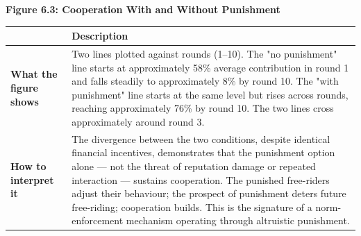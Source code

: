 \documentclass[12pt, letterpaper]{article}
\begin{document}
\newpage
\textbf{Figure 6.3: Cooperation With and Without Punishment}

\begin{figure}[htbp]
\centering

\begin{subfigure}{0.52\textwidth}
\centering
{}
\end{subfigure}

\hfill
\end{figure}


\begin{table}[H]
\centering
\small
\begin{tabularx}{\linewidth}{lY}
\toprule
 & Description \\
\midrule
\textbf{What the figure shows} & Two lines plotted against rounds (1--10). The "no punishment" line starts at approximately 58\% average contribution in round 1 and falls steadily to approximately 8\% by round 10. The "with punishment" line starts at the same level but rises across rounds, reaching approximately 76\% by round 10. The two lines cross approximately around round 3. \\
\textbf{How to interpret it} & The divergence between the two conditions, despite identical financial incentives, demonstrates that the punishment option alone --- not the threat of reputation damage or repeated interaction --- sustains cooperation. The punished free-riders adjust their behaviour; the prospect of punishment deters future free-riding; cooperation builds. This is the signature of a norm-enforcement mechanism operating through altruistic punishment. \\
\bottomrule
\end{tabularx}
\end{table}
\end{document}
